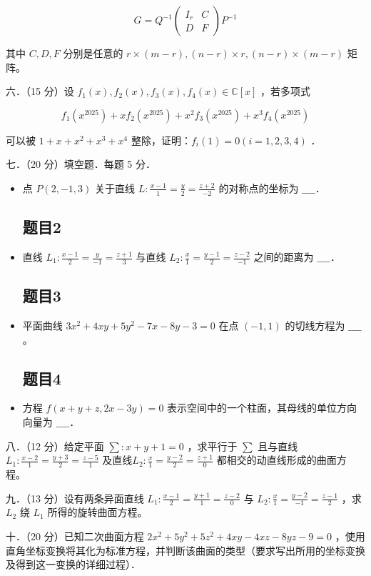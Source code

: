 \documentclass{article}
\begin{document}
\[
G=Q^{-1}\left(\begin{array}{cc}
I_{r} & C \\
D & F
\end{array}\right) P^{-1}
\]

其中 \(C, D, F\) 分别是任意的 \(r \times(m-r),(n-r) \times r,(n-r) \times(m-r)\) 矩阵。

六．（15 分）设 \(f_{1}(x), f_{2}(x), f_{3}(x), f_{4}(x) \in \mathbb{C}[x]\) ，若多项式

\[
f_{1}\left(x^{2025}\right)+x f_{2}\left(x^{2025}\right)+x^{2} f_{3}\left(x^{2025}\right)+x^{3} f_{4}\left(x^{2025}\right)
\]

可以被 \(1+x+x^{2}+x^{3}+x^{4}\) 整除，证明：\(f_{i}(1)=0(i=1,2,3,4)\) ．

七．（20 分）填空题．每题 5 分．

\begin{itemize}

\subsection{题目1}
  \item[1．] 点 \(P(2,-1,3)\) 关于直线 \(L: \frac{x-1}{1}=\frac{y}{2}=\frac{z+2}{-2}\) 的对称点的坐标为 \(\_\_\_\_\)．

\subsection{题目2}
  \item[2．] 直线 \(L_{1}: \frac{x-1}{2}=\frac{y}{-1}=\frac{z+1}{3}\) 与直线 \(L_{2}: \frac{x}{1}=\frac{y-1}{2}=\frac{z-2}{-1}\) 之间的距离为 \(\_\_\_\_\)．

\subsection{题目3}
  \item[3．] 平面曲线 \(3 x^{2}+4 x y+5 y^{2}-7 x-8 y-3=0\) 在点 \((-1,1)\) 的切线方程为 \(\_\_\_\_\)。

\subsection{题目4}
  \item[4．] 方程 \(f(x+y+z, 2 x-3 y)=0\) 表示空间中的一个柱面，其母线的单位方向向量为 \(\_\_\_\_\)．
\end{itemize}

八．（12 分）给定平面 \(\sum: x+y+1=0\) ，求平行于 \(\sum\) 且与直线 \(L_{1}: \frac{x-2}{1}=\frac{y+3}{2}=\frac{z-5}{1}\) 及直线\(L_{2}: \frac{x}{1}=\frac{y-2}{2}=\frac{z+1}{0}\) 都相交的动直线形成的曲面方程。

九．（13 分）设有两条异面直线 \(L_{1}: \frac{x-1}{2}=\frac{y+1}{1}=\frac{z-2}{0}\) 与 \(L_{2}: \frac{x}{1}=\frac{y-2}{-1}=\frac{z-1}{2}\) ，求 \(L_{2}\) 绕 \(L_{1}\) 所得的旋转曲面方程。

十．（20 分）已知二次曲面方程 \(2 x^{2}+5 y^{2}+5 z^{2}+4 x y-4 x z-8 y z-9=0\) ，使用直角坐标变换将其化为标准方程，并判断该曲面的类型（要求写出所用的坐标变换及得到这一变换的详细过程）．
\end{document}
